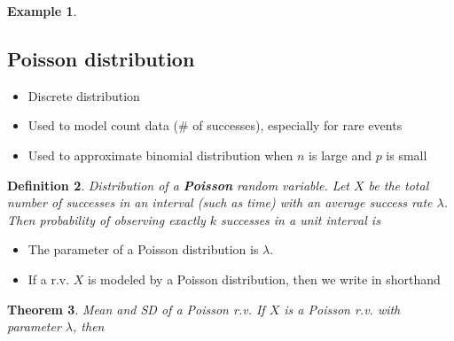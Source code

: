 \documentclass[12pt]{amsart}
\newtheorem{theorem}{Theorem}[section]
\newtheorem{definition}[theorem]{Definition}
\newtheorem{example}[theorem]{Example}
\begin{document}
{\begin{example}
\begin{enumerate}
\end{enumerate}

\end{example} 


\newpage
\subsection{Poisson distribution}

\vspace{.5cm}

\begin{itemize}
\item Discrete distribution
\item Used to model count data (\# of successes), especially for rare events
\item Used to approximate binomial distribution when $n$ is large and $p$ is small
\end{itemize}

\vspace{.5cm}

\begin{definition}{Distribution of a \textbf{Poisson} random variable.} \newline
Let $X$ be the total number of successes in an interval (such as time) with an average success rate $\lambda$. \newline
Then probability of observing exactly $k$ successes in a unit interval is
\vspace{3cm}
\end{definition}


\begin{itemize}
\item The parameter of a Poisson distribution is $\lambda$. 
\item If a r.v. $X$ is modeled by a Poisson distribution, then we write in shorthand  
\vspace{1cm}
\end{itemize}

\begin{theorem}{Mean and SD of a Poisson r.v.} \newline
If $X$ is a Poisson r.v. with parameter $\lambda$, then 


\end{theorem}}
\end{document}
